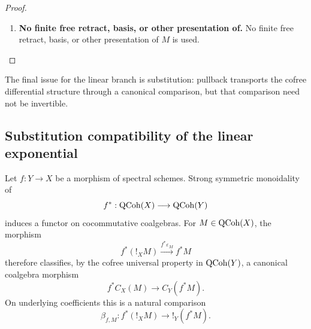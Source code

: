 \begin{proof}
\begin{enumerate}[label=\textup{(\arabic*)}]
    \item \textbf{No finite free retract, basis, or other presentation of.}
    No finite free retract, basis, or other presentation of \(M\) is used.
\end{enumerate}
\end{proof}
The final issue for the linear branch is substitution: pullback transports the
cofree differential structure through a canonical comparison, but that
comparison need not be invertible.

\subsection{Substitution compatibility of the linear exponential}

\begin{construction}
\label{con:cofree-coalgebra-substitution-comparison}
Let \(f:Y\to X\) be a morphism of spectral schemes. Strong symmetric
monoidality of
\[
    f^*:\operatorname{QCoh}(X)\longrightarrow\operatorname{QCoh}(Y)
\]
induces a functor on cocommutative coalgebras. For
\(M\in\operatorname{QCoh}(X)\), the morphism
\[
    f^*(!_XM)\xrightarrow{f^*\varepsilon_M}f^*M
\]
therefore classifies, by the cofree universal property in \(\operatorname{QCoh}(Y)\), a
canonical coalgebra morphism
\[
    f^*C_X(M)\longrightarrow C_Y(f^*M).
\]
On underlying coefficients this is a natural comparison
\[
    \beta_{f,M}:
    f^*(!_XM)
    \longrightarrow
    !_Y(f^*M).
\]
\end{construction}

